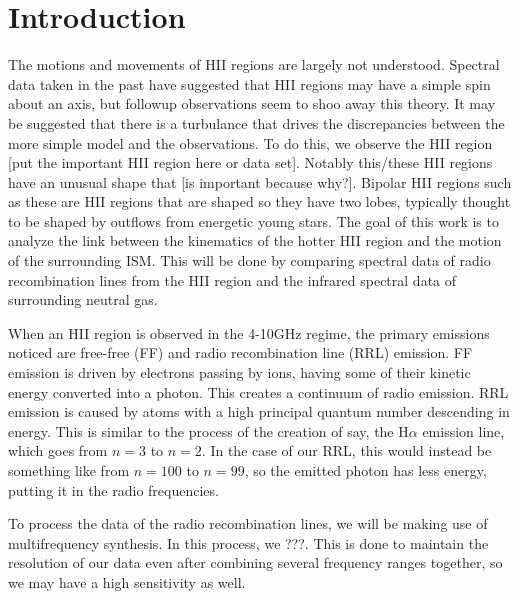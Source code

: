 \documentclass{article}
\begin{document}
\section{Introduction}

The motions and movements of HII regions are largely not understood. Spectral data taken in the past have suggested that HII regions may have a simple spin about an axis, but followup observations seem to shoo away this theory. It may be suggested that there is a turbulance that drives the discrepancies between the more simple model and the observations. To do this, we observe the HII region [put the important HII region here or data set]. Notably this/these HII regions have an unusual shape that [is important because why?]. Bipolar HII regions such as these are HII regions that are shaped so they have two lobes, typically thought to be shaped by outflows from energetic young stars. The goal of this work is to analyze the link between the kinematics of the hotter HII region and the motion of the surrounding ISM. This will be done by comparing spectral data of radio recombination lines from the HII region and the infrared spectral data of surrounding neutral gas. 

When an HII region is observed in the 4-10GHz regime, the primary emissions noticed are free-free (FF) and radio recombination line (RRL) emission. FF emission is driven by electrons passing by ions, having some of their kinetic energy converted into a photon. This creates a continuum of radio emission. RRL emission is caused by atoms with a high principal quantum number descending in energy. This is similar to the process of the creation of say, the H$\alpha$ emission line, which goes from $n=3$ to $n=2$. In the case of our RRL, this would instead be something like from $n=100$ to $n=99$, so the emitted photon has less energy, putting it in the radio frequencies.

To process the data of the radio recombination lines, we will be making use of multifrequency synthesis. In this process, we ???. This is done to maintain the resolution of our data even after combining several frequency ranges together, so we may have a high sensitivity as well.
\end{document}
